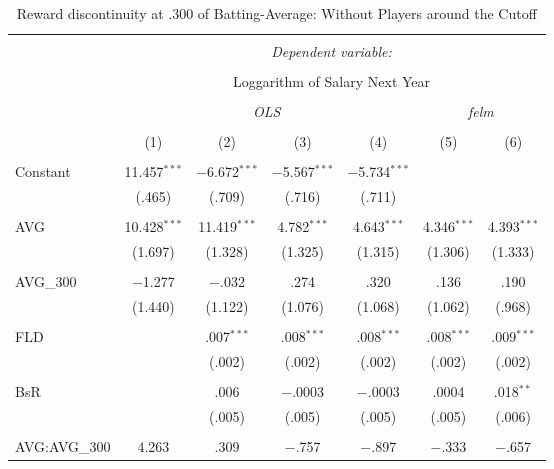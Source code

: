 
\begin{table}[H] \centering
  \caption{Reward discontinuity at .300 of Batting-Average: Without Players around the Cutoff}
  \label{AVG300_E}
\tiny
\begin{tabular}{@{\extracolsep{5pt}}lcccccc}
\\[-1.8ex]\hline
\hline \\[-1.8ex]
 & \multicolumn{6}{c}{\textit{Dependent variable:}} \\
\cline{2-7}
\\[-1.8ex] & \multicolumn{6}{c}{Loggarithm of Salary Next Year} \\
\\[-1.8ex] & \multicolumn{4}{c}{\textit{OLS}} & \multicolumn{2}{c}{\textit{felm}} \\
\\[-1.8ex] & (1) & (2) & (3) & (4) & (5) & (6)\\
\hline \\[-1.8ex]
 Constant & 11.457$^{***}$ & $-$6.672$^{***}$ & $-$5.567$^{***}$ & $-$5.734$^{***}$ &  &  \\
  & (.465) & (.709) & (.716) & (.711) &  &  \\
  & & & & & & \\
 AVG & 10.428$^{***}$ & 11.419$^{***}$ & 4.782$^{***}$ & 4.643$^{***}$ & 4.346$^{***}$ & 4.393$^{***}$ \\
  & (1.697) & (1.328) & (1.325) & (1.315) & (1.306) & (1.333) \\
  & & & & & & \\
 AVG\_300 & $-$1.277 & $-$.032 & .274 & .320 & .136 & .190 \\
  & (1.440) & (1.122) & (1.076) & (1.068) & (1.062) & (.968) \\
  & & & & & & \\
 FLD &  & .007$^{***}$ & .008$^{***}$ & .008$^{***}$ & .008$^{***}$ & .009$^{***}$ \\
  &  & (.002) & (.002) & (.002) & (.002) & (.002) \\
  & & & & & & \\
 BsR &  & .006 & $-$.0003 & $-$.0003 & .0004 & .018$^{**}$ \\
  &  & (.005) & (.005) & (.005) & (.005) & (.006) \\
  & & & & & & \\
 AVG:AVG\_300 & 4.263 & .309 & $-$.757 & $-$.897 & $-$.333 & $-$.657 \\

\end{tabular}
\end{table}
